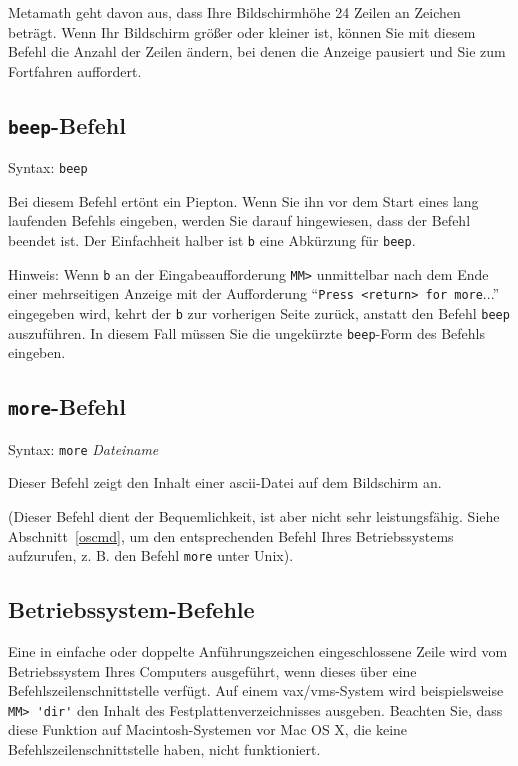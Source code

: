 Metamath geht davon aus, dass Ihre Bildschirmhöhe 24 Zeilen an Zeichen beträgt.  Wenn Ihr Bildschirm größer oder kleiner ist, können Sie mit diesem Befehl die Anzahl der Zeilen ändern, bei denen die Anzeige pausiert und Sie zum Fortfahren auffordert. 


\subsection{\texttt{beep}-Befehl}

Syntax:  \texttt{beep}

Bei diesem Befehl ertönt ein Piepton.  Wenn Sie ihn vor dem Start eines lang laufenden Befehls eingeben, werden Sie darauf hingewiesen, dass der Befehl beendet ist.  Der Einfachheit halber ist \texttt{b} eine Abkürzung für \texttt{beep}. 

Hinweis: Wenn \texttt{b} an der Eingabeaufforderung \texttt{MM>} unmittelbar nach dem Ende einer mehrseitigen Anzeige mit der Aufforderung "`\texttt{Press <return> for more}..."' eingegeben wird, kehrt der \texttt{b} zur vorherigen Seite zurück, anstatt den Befehl \texttt{beep} auszuführen. In diesem Fall müssen Sie die ungekürzte \texttt{beep}-Form des Befehls eingeben. 


\subsection{\texttt{more}-Befehl}

Syntax:  \texttt{more} {\em Dateiname}

Dieser Befehl zeigt den Inhalt einer {\sc ascii}-Datei auf dem Bildschirm an.  

(Dieser Befehl dient der Bequemlichkeit, ist aber nicht sehr leistungsfähig.  Siehe Abschnitt~\ref{oscmd}, um den entsprechenden Befehl Ihres Betriebssystems aufzurufen, z. B. den Befehl \texttt{more} unter Unix). 


\subsection{Betriebssystem-Befehle}\label{oscmd}

Eine in einfache oder doppelte Anführungszeichen eingeschlossene Zeile wird vom Betriebssystem Ihres Computers ausgeführt, wenn dieses über eine Befehlszeilenschnittstelle verfügt.  Auf einem {\sc vax/vms}-System wird beispielsweise \verb/MM> 'dir'/ den Inhalt des Festplattenverzeichnisses ausgeben.  Beachten Sie, dass diese Funktion auf Macintosh-Systemen vor Mac OS X, die keine Befehlszeilenschnittstelle haben, nicht funktioniert.  

